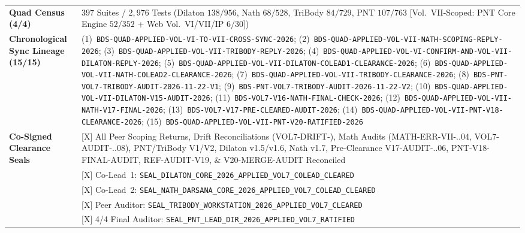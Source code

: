 \documentclass[11pt,a4paper,reqno]{article}
\def\texttt#1{#1}%
\theoremstyle{plain}
\theoremstyle{definition}
\theoremstyle{remark}
\numberwithin{equation}{section}
\numberwithin{table}{section}
\begin{document}
\begin{table}[H]
\begin{tabularx}{\textwidth}{@{} P{3.75cm} Y @{}}
\textbf{Quad Census (4/4)} & $397$ Suites / $2{,}976$ Tests (Dilaton $138/956$, Nath $68/528$, TriBody $84/729$, PNT $107/763$ [Vol.~VII-Scoped: PNT Core Engine $52/352$ + Web Vol.~VI/VII/IP $6/30$]) \\
\textbf{Chronological Sync Lineage (15/15)} &
  (1)~\nolinkurl{BDS-QUAD-APPLIED-VOL-VI-TO-VII-CROSS-SYNC-2026};
  (2)~\nolinkurl{BDS-QUAD-APPLIED-VOL-VII-NATH-SCOPING-REPLY-2026};
  (3)~\nolinkurl{BDS-QUAD-APPLIED-VOL-VII-TRIBODY-REPLY-2026};
  (4)~\nolinkurl{BDS-QUAD-APPLIED-VOL-VI-CONFIRM-AND-VOL-VII-DILATON-REPLY-2026};
  (5)~\nolinkurl{BDS-QUAD-APPLIED-VOL-VII-DILATON-COLEAD1-CLEARANCE-2026};
  (6)~\nolinkurl{BDS-QUAD-APPLIED-VOL-VII-NATH-COLEAD2-CLEARANCE-2026};
  (7)~\nolinkurl{BDS-QUAD-APPLIED-VOL-VII-TRIBODY-CLEARANCE-2026};
  (8)~\nolinkurl{BDS-PNT-VOL7-TRIBODY-AUDIT-2026-11-22-V1};
  (9)~\nolinkurl{BDS-PNT-VOL7-TRIBODY-AUDIT-2026-11-22-V2};
  (10)~\nolinkurl{BDS-QUAD-APPLIED-VOL-VII-DILATON-V15-AUDIT-2026};
  (11)~\nolinkurl{BDS-VOL7-V16-NATH-FINAL-CHECK-2026};
  (12)~\nolinkurl{BDS-QUAD-APPLIED-VOL-VII-NATH-V17-FINAL-2026};
  (13)~\nolinkurl{BDS-VOL7-V17-PRE-CLEARED-AUDIT-2026};
  (14)~\nolinkurl{BDS-QUAD-APPLIED-VOL-VII-PNT-V18-CLEARANCE-2026};
  (15)~\nolinkurl{BDS-QUAD-APPLIED-VOL-VII-PNT-V20-RATIFIED-2026} \\
\textbf{Co-Signed Clearance Seals} &
  \texttt{[X]} All Peer Scoping Returns, Drift Reconciliations (\texttt{VOL7-\allowbreak DRIFT-\allowbreak *}), Math Audits (\texttt{MATH-\allowbreak ERR-\allowbreak VII-..04}, \texttt{VOL7-\allowbreak AUDIT-\allowbreak 01..08}), PNT/TriBody V1/V2, Dilaton v1.5/v1.6, Nath v1.7, Pre-Clearance \texttt{V17-\allowbreak AUDIT-..06}, \texttt{PNT-\allowbreak V18-\allowbreak FINAL-\allowbreak AUDIT}, \texttt{REF-\allowbreak AUDIT-\allowbreak V19}, \& \texttt{V20-\allowbreak MERGE-\allowbreak AUDIT} Reconciled \\
  & \texttt{[X]} Co-Lead~1: \nolinkurl{SEAL_DILATON_CORE_2026_APPLIED_VOL7_COLEAD_CLEARED} \\
  & \texttt{[X]} Co-Lead~2: \nolinkurl{SEAL_NATH_DARSANA_CORE_2026_APPLIED_VOL7_COLEAD_CLEARED} \\
  & \texttt{[X]} Peer Auditor: \nolinkurl{SEAL_TRIBODY_WORKSTATION_2026_APPLIED_VOL7_CLEARED} \\
  & \texttt{[X]} 4/4 Final Auditor: \nolinkurl{SEAL_PNT_LEAD_DIR_2026_APPLIED_VOL7_RATIFIED} \\
\bottomrule
\end{tabularx}
\end{table}
\end{document}
